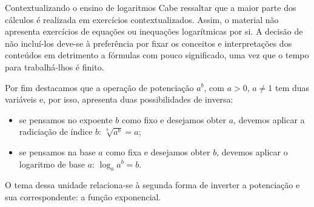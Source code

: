 \begin{apresentacao}{Contextualizando o ensino de logaritmos}
Cabe ressaltar que a maior parte dos cálculos é realizada em exercícios contextualizados. Assim, o material não apresenta exercícios de equações ou inequações logarítmicas por si. A decisão de não incluí-los deve-se à preferência por fixar os conceitos e interpretações dos conteúdos em detrimento a fórmulas com pouco significado, uma vez que o tempo para trabalhá-lhos é finito.

Por fim destacamos que a operação de potenciação $a^b$, com $a>0$, $a\neq 1$ tem duas variáveis e, por isso, apresenta duas possibilidades de inversa:
\begin{itemize}
\item se pensamos no expoente $b$ como fixo e desejamos obter $a$, devemos aplicar a radiciação de índice $b$: $\sqrt[b]{a^b}=a$;
\item se pensamos na base $a$ como fixa e desejamos obter $b$, devemos aplicar o logaritmo de base $a$: $\log_a a^b =b$.
\end{itemize}
O tema dessa unidade relaciona-se à segunda forma de inverter a potenciação e sua correspondente: a função exponencial.



\end{apresentacao}

